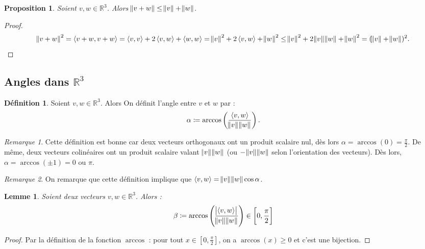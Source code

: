 \documentclass{article}
\newcommand{\R}{\mathbb R}
\newcommand{\scpr}[2]{\left\langle #1, #2\right\rangle}
\renewcommand{\interval}[2]{\left[#1, #2\right]}
\newtheorem{prp}[thm]{Proposition}
\newtheorem{lem}[thm]{Lemme}
\theoremstyle{definition}
\newtheorem{déf}[thm]{Définition}
\theoremstyle{remark}
\newtheorem*{rmq}{Remarque}
\begin{document}
		\begin{prp} Soient $v, w \in \R^3$. Alors $\norm {v+w} \leq \norm v+\norm w$. \end{prp}

		\begin{proof} \[\norm {v+w}^2 = \scpr {v+w}{v+w} = \scpr vv + 2\scpr vw + \scpr ww = \norm v^2 + 2\scpr vw + \norm w^2 \leq \norm v^2 + 2\norm v\norm w + \norm w^2
		= (\norm v + \norm w)^2.\] \end{proof}

	\subsection{Angles dans $\R^3$}
		\begin{déf} Soient $v, w \in \R^3$. Alors On définit l'angle entre $v$ et $w$ par :
		\[\alpha \coloneqq \arccos\left(\frac {\scpr vw}{\norm v\norm w}\right).\] \end{déf}

		\begin{rmq} Cette définition est bonne car deux vecteurs orthogonaux ont un produit scalaire nul, dès lors $\alpha = \arccos(0) = \frac \pi2$. De même, deux vecteurs
		colinéaires ont un produit scalaire valant $\norm v\norm w$ (ou $-\norm v\norm w$ selon l'orientation des vecteurs). Dès lors, $\alpha = \arccos(\pm 1) = 0$ ou $\pi$.
		\end{rmq}

		\begin{rmq} On remarque que cette définition implique que $\scpr vw = \norm v\norm w \cos \alpha$. \end{rmq}

		\begin{lem} Soient deux vecteurs $v, w \in \R^3$. Alors :\[\beta \coloneqq \arccos\left(\frac {\abs {\scpr vw}}{\norm v\norm w}\right) \in \interval 0{\frac \pi2}\]
		\end{lem}

		\begin{proof} Par la définition de la fonction $\arccos$ : pour tout $x \in \interval 0{\frac \pi2}$, on a $\arccos(x) \geq 0$ et c'est une bijection. \end{proof}
\end{document}
